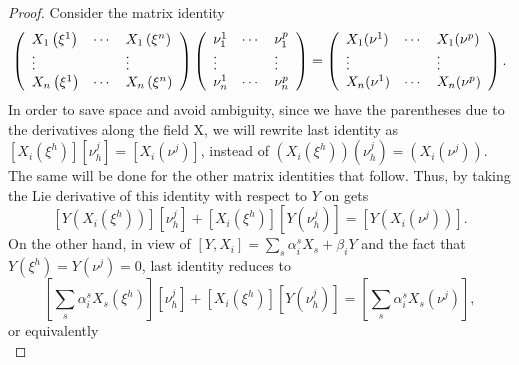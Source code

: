 \documentclass[12pt,english]{elsarticle}
\theoremstyle{plain}
\theoremstyle{plain}
\theoremstyle{remark}
\theoremstyle{plain}
\theoremstyle{definition}
\theoremstyle{definition}
\begin{document}
\begin{proof}
Consider the matrix identity
%
\begin{equation*}
\left (
%
\begin{array}{l@{\quad}l@{\quad}l}
X_{1}\left (\xi ^{1}\right ) & \cdots & X_{1}\left (\xi ^{n}\right )
\\
\vdots & & \vdots
\\
X_{n}\left (\xi ^{1}\right ) & \cdots & X_{n}\left (\xi ^{n}\right )
\end{array}
%
\right )\left (
%
\begin{array}{l@{\quad}l@{\quad}l}
\nu _{1}^{1} & \cdots & \nu _{1}^{p}
\\
\vdots & & \vdots
\\
\nu _{n}^{1} & \cdots & \nu _{n}^{p}
\end{array}
%
\right )=\left (
%
\begin{array}{l@{\quad}l@{\quad}l}
X_{1}(\nu ^{1}) & \cdots & X_{1}(\nu ^{p})
\\
\vdots & & \vdots
\\
X_{n}(\nu ^{1}) & \cdots & X_{n}(\nu ^{p})
\end{array}
%
\right ).
\end{equation*}
%
In order to save space and avoid ambiguity, since we have the parentheses
due to the derivatives along the field X, we will rewrite last identity
as
$\left [X_{i}(\xi ^{h})\right ]\left [\nu _{h}^{j}\right ]=\left [X_{i}(
\nu ^{j})\right ]$, instead of
$\left (X_{i}(\xi ^{h})\right )\left (\nu _{h}^{j}\right )=\left (X_{i}(
\nu ^{j})\right )$. The same will be done for the other matrix identities
that follow. Thus, by taking the Lie derivative of this identity with respect
to $Y$ on gets
%
\begin{equation*}
\left [Y\left (X_{i}(\xi ^{h})\right )\right ]\left [\nu _{h}^{j}
\right ]+\left [X_{i}(\xi ^{h})\right ]\left [Y(\nu _{h}^{j})\right ]=
\left [Y\left (X_{i}(\nu ^{j})\right )\right ].
\end{equation*}
%
On the other hand, in view of
$[Y,X_{i}]=\sum _{s}\alpha _{i}^{s}X_{s}+\beta _{i}Y$ and the fact that
$Y(\xi ^{h})=Y(\nu ^{j})=0$, last identity reduces to
%
\begin{equation*}
\left [\sum _{s}\alpha _{i}^{s}X_{s}(\xi ^{h})\right ]\left [\nu _{h}^{j}
\right ]+\left [X_{i}(\xi ^{h})\right ]\left [Y(\nu _{h}^{j})\right ]=
\left [\sum _{s}\alpha _{i}^{s}X_{s}(\nu ^{j})\right ],
\end{equation*}
%
or equivalently
%
\begin{equation*}

\end{equation*}
\end{proof}
\end{document}
